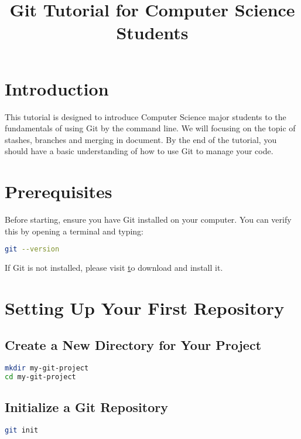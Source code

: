 \documentclass{article}
\title{Git Tutorial for Computer Science Students}
\author{}
\date{}
\begin{document}
\maketitle

\section{Introduction}

This tutorial is designed to introduce Computer Science major students to the fundamentals of using Git by the command line. We will focusing on the topic of stashes, branches and merging in document. By the end of the tutorial, you should have a basic understanding of how to use Git to manage your code.

\section{Prerequisites}

Before starting, ensure you have Git installed on your computer. You can verify this by opening a terminal and typing:

\begin{lstlisting}[language=bash]
git --version
\end{lstlisting}

If Git is not installed, please visit \href{https://github.com/} to download and install it.

\section{Setting Up Your First Repository}

\subsection{Create a New Directory for Your Project}

\begin{lstlisting}[language=bash]
mkdir my-git-project
cd my-git-project
\end{lstlisting}

\subsection{Initialize a Git Repository}

\begin{lstlisting}[language=bash]
git init
\end{lstlisting}
\end{document}
